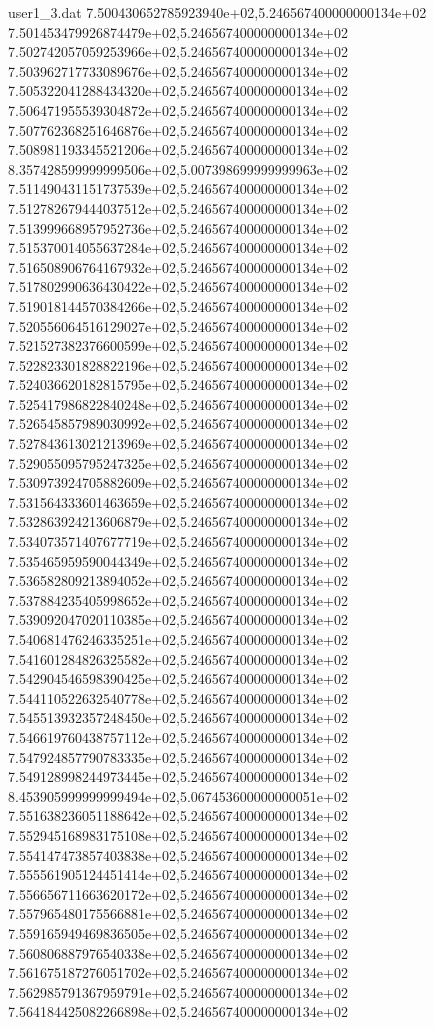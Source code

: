 \begin{filecontents}{user1_3.dat}
7.500430652785923940e+02,5.246567400000000134e+02
7.501453479926874479e+02,5.246567400000000134e+02
7.502742057059253966e+02,5.246567400000000134e+02
7.503962717733089676e+02,5.246567400000000134e+02
7.505322041288434320e+02,5.246567400000000134e+02
7.506471955539304872e+02,5.246567400000000134e+02
7.507762368251646876e+02,5.246567400000000134e+02
7.508981193345521206e+02,5.246567400000000134e+02
8.357428599999999506e+02,5.007398699999999963e+02
7.511490431151737539e+02,5.246567400000000134e+02
7.512782679444037512e+02,5.246567400000000134e+02
7.513999668957952736e+02,5.246567400000000134e+02
7.515370014055637284e+02,5.246567400000000134e+02
7.516508906764167932e+02,5.246567400000000134e+02
7.517802990636430422e+02,5.246567400000000134e+02
7.519018144570384266e+02,5.246567400000000134e+02
7.520556064516129027e+02,5.246567400000000134e+02
7.521527382376600599e+02,5.246567400000000134e+02
7.522823301828822196e+02,5.246567400000000134e+02
7.524036620182815795e+02,5.246567400000000134e+02
7.525417986822840248e+02,5.246567400000000134e+02
7.526545857989030992e+02,5.246567400000000134e+02
7.527843613021213969e+02,5.246567400000000134e+02
7.529055095795247325e+02,5.246567400000000134e+02
7.530973924705882609e+02,5.246567400000000134e+02
7.531564333601463659e+02,5.246567400000000134e+02
7.532863924213606879e+02,5.246567400000000134e+02
7.534073571407677719e+02,5.246567400000000134e+02
7.535465959590044349e+02,5.246567400000000134e+02
7.536582809213894052e+02,5.246567400000000134e+02
7.537884235405998652e+02,5.246567400000000134e+02
7.539092047020110385e+02,5.246567400000000134e+02
7.540681476246335251e+02,5.246567400000000134e+02
7.541601284826325582e+02,5.246567400000000134e+02
7.542904546598390425e+02,5.246567400000000134e+02
7.544110522632540778e+02,5.246567400000000134e+02
7.545513932357248450e+02,5.246567400000000134e+02
7.546619760438757112e+02,5.246567400000000134e+02
7.547924857790783335e+02,5.246567400000000134e+02
7.549128998244973445e+02,5.246567400000000134e+02
8.453905999999999494e+02,5.067453600000000051e+02
7.551638236051188642e+02,5.246567400000000134e+02
7.552945168983175108e+02,5.246567400000000134e+02
7.554147473857403838e+02,5.246567400000000134e+02
7.555561905124451414e+02,5.246567400000000134e+02
7.556656711663620172e+02,5.246567400000000134e+02
7.557965480175566881e+02,5.246567400000000134e+02
7.559165949469836505e+02,5.246567400000000134e+02
7.560806887976540338e+02,5.246567400000000134e+02
7.561675187276051702e+02,5.246567400000000134e+02
7.562985791367959791e+02,5.246567400000000134e+02
7.564184425082266898e+02,5.246567400000000134e+02

\end{filecontents}
